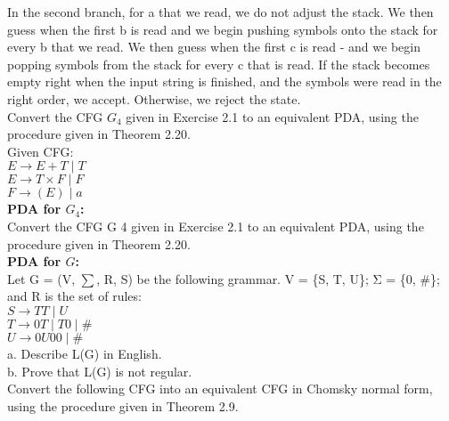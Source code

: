 \documentclass[12pt]{article}
\begin{document}
In the second branch, for a that we read, we do not adjust the stack. We then guess
when the first b is read and we begin pushing symbols onto the stack for every b that
we read. We then guess when the first c is read - and we begin popping symbols from the
stack for every c that is read. If the stack becomes empty right when the input string
is finished, and the symbols were read in the right order, we accept. Otherwise, we
reject the state. \\

\pagebreak
{} Convert the CFG $G_4$ given in Exercise 2.1 to an equivalent PDA, using the procedure given in Theorem 2.20. \\

\noindent
Given CFG: \\
$E \rightarrow E + T \; | \; T $ \\
$E \rightarrow T \times F \; | \; F $ \\
$F \rightarrow (E) \; | \; a $ \\

\noindent
\textbf{PDA for $G_4$:} \\

\pagebreak
{} Convert the CFG G 4 given in Exercise 2.1 to an equivalent PDA, using the procedure given in Theorem 2.20. \\

\noindent
\textbf{PDA for $G$:} \\

\pagebreak
{} Let G = (V, $\sum$, R, S) be the following grammar. V = \{S, T, U\}; Σ = \{0, \#\}; and
R is the set of rules: \\

\noindent
$S \rightarrow TT \; | \; U$ \\
$T \rightarrow 0T \; | \; T 0 \; | \; \#$ \\
$U \rightarrow 0U 00 \; | \; \#$ \\

\noindent
a. Describe L(G) in English. \\
b. Prove that L(G) is not regular. \\

 Convert the following CFG into an equivalent CFG in Chomsky normal form,
using the procedure given in Theorem 2.9. \\
\end{document}
